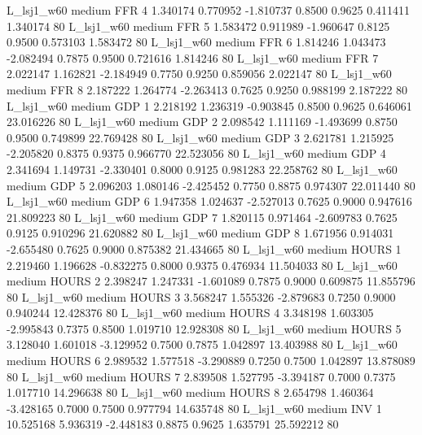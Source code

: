     L_lsj1_w60     medium      FFR                 4  1.340174 0.770952 -1.810737 0.8500 0.9625  0.411411    1.340174 80
    L_lsj1_w60     medium      FFR                 5  1.583472 0.911989 -1.960647 0.8125 0.9500  0.573103    1.583472 80
    L_lsj1_w60     medium      FFR                 6  1.814246 1.043473 -2.082494 0.7875 0.9500  0.721616    1.814246 80
    L_lsj1_w60     medium      FFR                 7  2.022147 1.162821 -2.184949 0.7750 0.9250  0.859056    2.022147 80
    L_lsj1_w60     medium      FFR                 8  2.187222 1.264774 -2.263413 0.7625 0.9250  0.988199    2.187222 80
    L_lsj1_w60     medium      GDP                 1  2.218192 1.236319 -0.903845 0.8500 0.9625  0.646061   23.016226 80
    L_lsj1_w60     medium      GDP                 2  2.098542 1.111169 -1.493699 0.8750 0.9500  0.749899   22.769428 80
    L_lsj1_w60     medium      GDP                 3  2.621781 1.215925 -2.205820 0.8375 0.9375  0.966770   22.523056 80
    L_lsj1_w60     medium      GDP                 4  2.341694 1.149731 -2.330401 0.8000 0.9125  0.981283   22.258762 80
    L_lsj1_w60     medium      GDP                 5  2.096203 1.080146 -2.425452 0.7750 0.8875  0.974307   22.011440 80
    L_lsj1_w60     medium      GDP                 6  1.947358 1.024637 -2.527013 0.7625 0.9000  0.947616   21.809223 80
    L_lsj1_w60     medium      GDP                 7  1.820115 0.971464 -2.609783 0.7625 0.9125  0.910296   21.620882 80
    L_lsj1_w60     medium      GDP                 8  1.671956 0.914031 -2.655480 0.7625 0.9000  0.875382   21.434665 80
    L_lsj1_w60     medium    HOURS                 1  2.219460 1.196628 -0.832275 0.8000 0.9375  0.476934   11.504033 80
    L_lsj1_w60     medium    HOURS                 2  2.398247 1.247331 -1.601089 0.7875 0.9000  0.609875   11.855796 80
    L_lsj1_w60     medium    HOURS                 3  3.568247 1.555326 -2.879683 0.7250 0.9000  0.940244   12.428376 80
    L_lsj1_w60     medium    HOURS                 4  3.348198 1.603305 -2.995843 0.7375 0.8500  1.019710   12.928308 80
    L_lsj1_w60     medium    HOURS                 5  3.128040 1.601018 -3.129952 0.7500 0.7875  1.042897   13.403988 80
    L_lsj1_w60     medium    HOURS                 6  2.989532 1.577518 -3.290889 0.7250 0.7500  1.042897   13.878089 80
    L_lsj1_w60     medium    HOURS                 7  2.839508 1.527795 -3.394187 0.7000 0.7375  1.017710   14.296638 80
    L_lsj1_w60     medium    HOURS                 8  2.654798 1.460364 -3.428165 0.7000 0.7500  0.977794   14.635748 80
    L_lsj1_w60     medium      INV                 1 10.525168 5.936319 -2.448183 0.8875 0.9625  1.635791   25.592212 80
